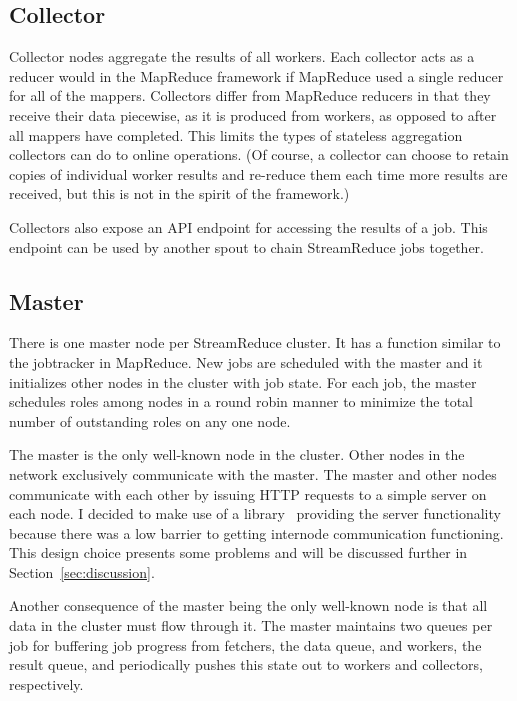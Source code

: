 \documentclass[12pt,twocolumn]{article}
\begin{document}
\subsection{Collector}
Collector nodes aggregate the results of all workers. Each collector acts as a reducer would
in the MapReduce framework if MapReduce used a single reducer for all of the mappers.
Collectors differ from MapReduce reducers in that they receive their data piecewise, as it
is produced from workers, as opposed to after all mappers have completed. This limits the
types of stateless aggregation collectors can do to online operations. (Of course, a collector
can choose to retain copies of individual worker results and re-reduce them each time more
results are received, but this is not in the spirit of the framework.)

Collectors also expose an API endpoint for accessing the results of a job. This endpoint
can be used by another spout to chain StreamReduce jobs together.
\subsection{Master}
\label{sec:master}
There is one master node per StreamReduce cluster. It has a function similar to the
jobtracker in
MapReduce. New jobs are scheduled with the master and it initializes other nodes in the
cluster with job state. For each job, the master schedules roles among nodes in a round
robin
manner to minimize the total number of outstanding roles on any one node.

The master is the only well-known node in the cluster. Other nodes in the network
exclusively
communicate with the master. The master and other nodes communicate with each other by
issuing
HTTP requests to a simple server on each node. I decided to make use of a
library~\cite{sinatrarb}
providing the server functionality because there was a low barrier to getting internode
communication functioning. This design choice presents some problems and will be
discussed
further in Section~\ref{sec:discussion}.

Another consequence of the master being the only well-known node is that all data in the
cluster must flow through it. The master maintains two queues per job for buffering job
progress from fetchers, the data queue, and workers, the result queue, and periodically
pushes this state out to workers and collectors, respectively.
\end{document}
